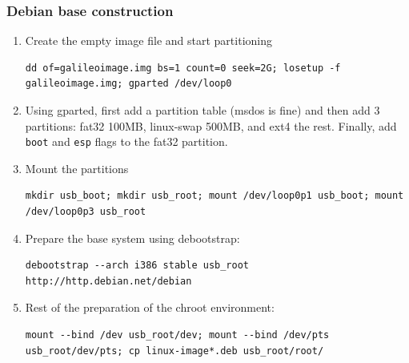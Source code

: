 \documentclass[a4paper,11pt]{article}
\newcommand{\cmd}[1]{\texttt{#1}}
\begin{document}
\subsubsection*{Debian base construction}
\begin{enumerate}
\item Create the empty image file and start partitioning 
\begin{lstlisting}
dd of=galileoimage.img bs=1 count=0 seek=2G; losetup -f galileoimage.img; gparted /dev/loop0
\end{lstlisting}

\item Using gparted, first add a partition table (msdos is fine) and then add 3 partitions: fat32 100MB, linux-swap 500MB, and ext4 the rest. Finally, add \cmd{boot} and \cmd{esp} flags to the fat32 partition.

\item Mount the partitions 
\begin{lstlisting}
mkdir usb_boot; mkdir usb_root; mount /dev/loop0p1 usb_boot; mount /dev/loop0p3 usb_root
\end{lstlisting}

\item Prepare the base system using debootstrap: 
\begin{lstlisting}
debootstrap --arch i386 stable usb_root http://http.debian.net/debian
\end{lstlisting}

\item Rest of the preparation of the chroot environment: 
\begin{lstlisting}
mount --bind /dev usb_root/dev; mount --bind /dev/pts usb_root/dev/pts; cp linux-image*.deb usb_root/root/
\end{lstlisting}
\end{enumerate}
\end{document}

